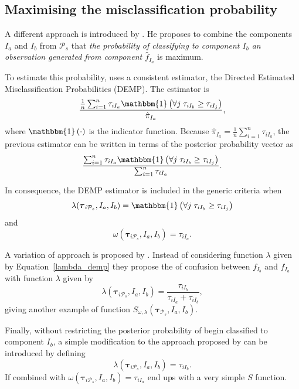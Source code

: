 \documentclass[10pt, a4paper]{article}
\theoremstyle{definition}
\newcommand{\m}[1]{\boldsymbol{#1}}
\begin{document}
\begin{spacing}{1.9}
\subsection{Maximising the misclassification probability}
\label{missclassification_section}

A different approach is introduced by \cite{hennig2010methods}. He proposes to combine the components $I_a$ and $I_b$ from $ \mathcal{P}_s$ that \emph{the probability of classifying to component $I_b$ an observation generated from component $\hat{f}_{I_a}$ } is maximum.

To estimate this probability,  \cite{hennig2010methods} uses a consistent estimator, the Directed Estimated Misclassification Probabilities (DEMP). The estimator is
\[
\frac{ \frac{1}{n} \sum_{i=1}^n {\tau_{iI_a} \mathbbm{1}\left( \forall j\; \tau_{i I_{b}} \geq \tau_{iI_j} \right)}}{ \hat{\pi}_{I_a}},
\]
where $\mathbbm{1}\left( \cdot \right)$ is the indicator function. Because $ \hat{\pi}_{I_a} = \frac{1}{n} \sum_{i=1}^n \tau_{iI_a}$, the previous estimator can be written in terms of the posterior probability vector as
\begin{equation}\label{demp_criteria}
\frac{ \sum_{i=1}^n {\tau_{iI_a} \mathbbm{1}\left( \forall j\; \tau_{i I_{b}} \geq \tau_{iI_j} \right)}}{\sum_{i=1}^n \tau_{iI_a} }.
\end{equation}

In consequence, the DEMP estimator is included in the generic criteria when
\begin{equation}\label{lambda_demp}
\lambda(\m\tau_{i \mathcal{P}_s},  I_a,  I_b) = \mathbbm{1}\left( \forall j\; \tau_{i I_{b}} \geq \tau_{iI_j} \right)
\end{equation}
and
\[
\omega(\m\tau_{i \mathcal{P}_s},  I_a,  I_b) =  \tau_{iI_a}.
\]

A variation of \cite{hennig2010methods} approach is proposed by \cite{longford2014}. Instead of considering function $\lambda$ given by Equation~\ref{lambda_demp} they propose the of confusion between $f_{I_b}$ and $f_{I_a}$ with function $\lambda$ given by
\[
\lambda(\m\tau_{i \mathcal{P}_s},  I_a,  I_b) = \frac{\tau_{iI_b}}{\tau_{iI_a} + \tau_{iI_b}},
\]
giving another example of function $S_{\omega, \lambda}( \m\tau_{\mathcal{P}_s},  I_a,  I_b)$.

Finally, without restricting  the posterior probability of begin classified to component $I_b$, a simple modification to the approach proposed by \cite{longford2014} can be introduced by defining
\[
\lambda(\m\tau_{i \mathcal{P}_s},  I_a,  I_b) = \tau_{iI_b}.
\]
If combined with $\omega(\m\tau_{i \mathcal{P}_s},  I_a,  I_b) =  \tau_{iI_a}$ end ups with a very simple $S$ function.


\end{spacing}
\end{document}
